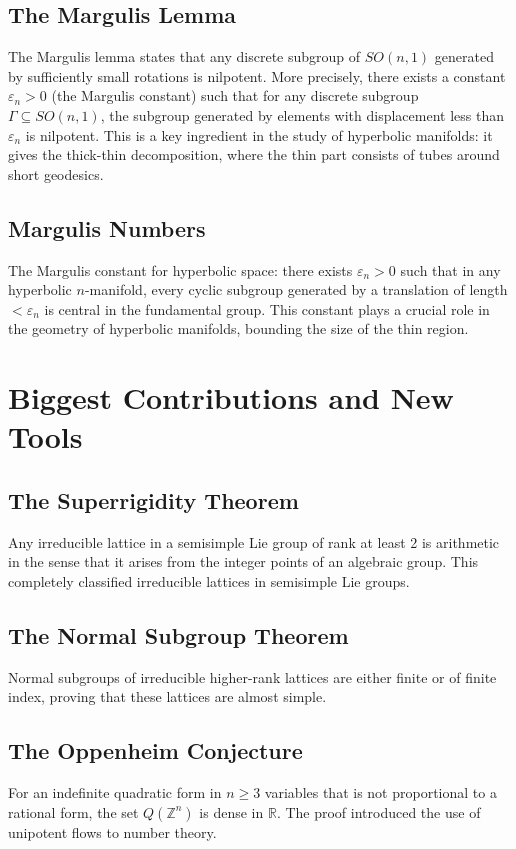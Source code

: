 \subsection{The Margulis Lemma}

The Margulis lemma states that any discrete subgroup of $SO(n,1)$ generated by sufficiently small rotations is nilpotent. More precisely, there exists a constant $\varepsilon_n > 0$ (the Margulis constant) such that for any discrete subgroup $\Gamma \subseteq SO(n,1)$, the subgroup generated by elements with displacement less than $\varepsilon_n$ is nilpotent. This is a key ingredient in the study of hyperbolic manifolds: it gives the thick-thin decomposition, where the thin part consists of tubes around short geodesics.

\subsection{Margulis Numbers}

The Margulis constant for hyperbolic space: there exists $\varepsilon_n > 0$ such that in any hyperbolic $n$-manifold, every cyclic subgroup generated by a translation of length $<\varepsilon_n$ is central in the fundamental group. This constant plays a crucial role in the geometry of hyperbolic manifolds, bounding the size of the thin region.

\section{Biggest Contributions and New Tools}

\subsection{The Superrigidity Theorem}
Any irreducible lattice in a semisimple Lie group of rank at least 2 is arithmetic in the sense that it arises from the integer points of an algebraic group. This completely classified irreducible lattices in semisimple Lie groups.

\subsection{The Normal Subgroup Theorem}
Normal subgroups of irreducible higher-rank lattices are either finite or of finite index, proving that these lattices are almost simple.

\subsection{The Oppenheim Conjecture}
For an indefinite quadratic form in $n \geq 3$ variables that is not proportional to a rational form, the set $Q(\mathbb{Z}^n)$ is dense in $\mathbb{R}$. The proof introduced the use of unipotent flows to number theory.

